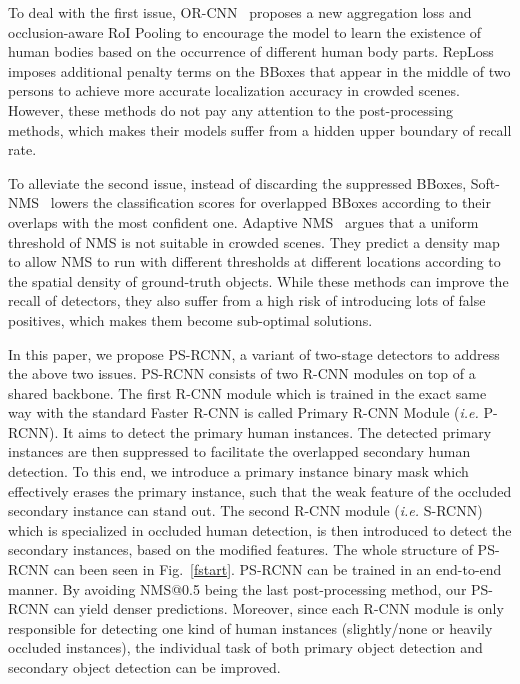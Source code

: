 \documentclass{article}
\begin{document}
To deal with the first issue, OR-CNN~\cite{Zhang2018Occlusion} proposes a new aggregation loss and occlusion-aware RoI Pooling to encourage the model to learn the existence of human bodies based on the occurrence of different human body parts. RepLoss~\cite{Repulsionloss} imposes additional penalty terms on the BBoxes that appear in the middle of two persons to achieve more accurate localization accuracy in crowded scenes. However, these methods do not pay any attention to the post-processing methods, which makes their models suffer from a hidden upper boundary of recall rate.

To alleviate the second issue, instead of discarding the suppressed BBoxes, Soft-NMS~\cite{softnms} lowers the classification scores for overlapped BBoxes according to their overlaps with the most confident one. Adaptive NMS~\cite{Liu2019Adaptive} argues that a uniform threshold of NMS is not suitable in crowded scenes. They predict a density map to allow NMS to run with different thresholds at different locations according to the spatial density of ground-truth objects. While these methods can improve the recall of detectors, they also suffer from a high risk of introducing lots of false positives, which makes them become sub-optimal solutions.

In this paper, we propose PS-RCNN, a variant of two-stage detectors to address the above two issues. PS-RCNN consists of two R-CNN modules on top of a shared backbone. The first R-CNN module which is trained in the exact same way with the standard Faster R-CNN is called Primary R-CNN Module (\emph{i.e.} P-RCNN). It aims to detect the primary human instances. The detected primary instances are then suppressed to facilitate the overlapped secondary human detection. To this end, we introduce a primary instance binary mask which effectively erases the primary instance, such that the weak feature of the occluded secondary instance can stand out. The second R-CNN module (\emph{i.e.} S-RCNN) which is specialized in occluded human detection, is then introduced to detect the secondary instances, based on the modified features. The whole structure of PS-RCNN can been seen in Fig.~\ref{fstart}. PS-RCNN can be trained in an end-to-end manner. By avoiding NMS@0.5 being the last post-processing method, our PS-RCNN can yield denser predictions. Moreover, since each R-CNN module is only responsible for detecting one kind of human instances (slightly/none or heavily occluded instances), the individual task of both primary object detection and secondary object detection can be improved.
\end{document}
